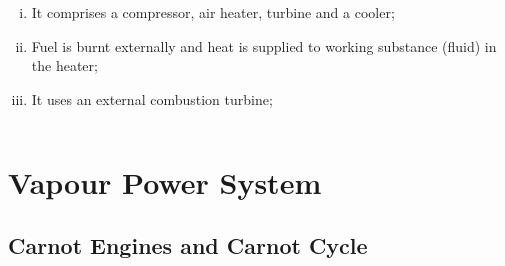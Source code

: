 \documentclass[10pt,compress]{beamer}
\begin{document}
\begin{frame}
\begin{columns}
\begin{column}[c]{0.5\linewidth}
{\begin{figure}
   \end{figure}}   \vspace{-.5cm}
     \begin{enumerate}[(i)]\scriptsize
       \item <7-> It comprises a compressor, air heater, turbine and a cooler;
       \item <8-> Fuel is burnt externally and heat is supplied to working substance (fluid) in the heater;
       \item <9-> It uses an external combustion turbine;
     \end{enumerate}
  \end{column}  
 \end{columns}
 \normalsize
\end{frame}


\section{Vapour Power System}

\subsection{Carnot Engines and Carnot Cycle}
\end{document}
